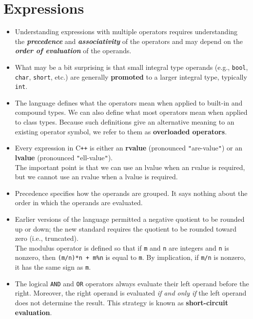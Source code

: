 \section{Expressions}
\begin{itemize}

\item
Understanding expressions with multiple operators requires understanding the \textbf{\textit{precedence}} and \textbf{\textit{associativity}} of the operators and may depend on the \textbf{\textit{order of evaluation}} of the operands.

\item
What may be a bit surprising is that small integral type operands (e.g., \texttt{bool}, \texttt{char}, \texttt{short}, etc.) are generally \textbf{promoted} to a larger integral type, typically \texttt{int}.

\item
The language defines what the operators mean when applied to built-in and compound types. We can also define what most operators mean when applied to class types. Because such definitions give an alternative meaning to an existing operator symbol, we refer to them as \textbf{overloaded operators}.

\item
Every expression in C\texttt{++} is either an \textbf{rvalue} (pronounced \texttt{"}are-value\texttt{"}) or an \textbf{lvalue} (pronounced \texttt{"}ell-value\texttt{"}).\\
The important point is that we can use an lvalue when an rvalue is required, but we cannot use an rvalue when a lvalue is required.

\item
Precedence specifies how the operands are grouped. It says nothing about the order in which the operands are evaluated.

\item
Earlier versions of the language permitted a negative quotient to be rounded up or down; the new standard requires the quotient to be rounded toward zero (i.e., truncated).\\
The modulus operator is defined so that if \texttt{m} and \texttt{n} are integers and \texttt{n} is nonzero, then \texttt{(m/n)*n + m\%n} is equal to \texttt{m}. By implication, if \texttt{m/n} is nonzero, it has the same sign as \texttt{m}.

\item
The logical \texttt{AND} and \texttt{OR} operators always evaluate their left operand before the right. Moreover, the right operand is evaluated \textit{if and only if} the left operand does not determine the result. This strategy is known as \textbf{short-circuit evaluation}.


\end{itemize}

